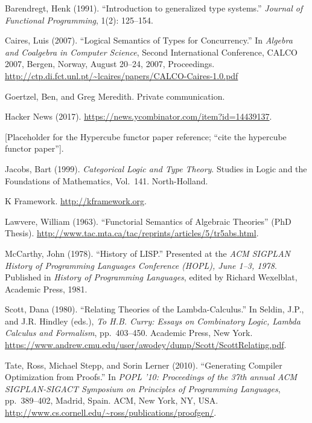 \documentclass{article}
\begin{document}
\begin{thebibliography}{99}

Barendregt, Henk (1991). 
``Introduction to generalized type systems.''  
\emph{Journal of Functional Programming}, 1(2): 125--154.

Caires, Luis (2007). 
``Logical Semantics of Types for Concurrency.'' 
In \emph{Algebra and Coalgebra in Computer Science}, 
Second International Conference, CALCO 2007, Bergen, Norway, August 20--24, 2007, Proceedings.
\url{http://ctp.di.fct.unl.pt/~lcaires/papers/CALCO-Caires-1.0.pdf}

Goertzel, Ben, and Greg Meredith. Private communication.

Hacker News (2017). 
\url{https://news.ycombinator.com/item?id=14439137}.

[Placeholder for the Hypercube functor paper reference; “cite the hypercube functor paper”].

Jacobs, Bart (1999).  
\textit{Categorical Logic and Type Theory}.  
Studies in Logic and the Foundations of Mathematics, Vol.\ 141.  
North-Holland.

K Framework.
\url{http://kframework.org}.

Lawvere, William (1963). 
``Functorial Semantics of Algebraic Theories'' (PhD Thesis). 
\url{http://www.tac.mta.ca/tac/reprints/articles/5/tr5abs.html}.

McCarthy, John (1978). 
``History of LISP.'' 
Presented at the \textit{ACM SIGPLAN History of Programming Languages Conference (HOPL), June 1--3, 1978}.  
Published in \textit{History of Programming Languages},  
edited by Richard Wexelblat,  
Academic Press, 1981.

Scott, Dana (1980). 
``Relating Theories of the Lambda-Calculus.'' 
In Seldin, J.P., and J.R. Hindley (eds.), 
\textit{To H.B. Curry: Essays on Combinatory Logic, Lambda Calculus and Formalism},  
pp.\ 403--450. Academic Press, New York.  
\url{https://www.andrew.cmu.edu/user/awodey/dump/Scott/ScottRelating.pdf}.

Tate, Ross, Michael Stepp, and Sorin Lerner (2010). 
``Generating Compiler Optimization from Proofs.'' 
In \emph{POPL '10: Proceedings of the 37th annual ACM SIGPLAN-SIGACT Symposium on Principles of Programming Languages}, 
pp.\ 389--402, Madrid, Spain. 
ACM, New York, NY, USA. 
\url{http://www.cs.cornell.edu/~ross/publications/proofgen/}.


\end{thebibliography}
\end{document}
